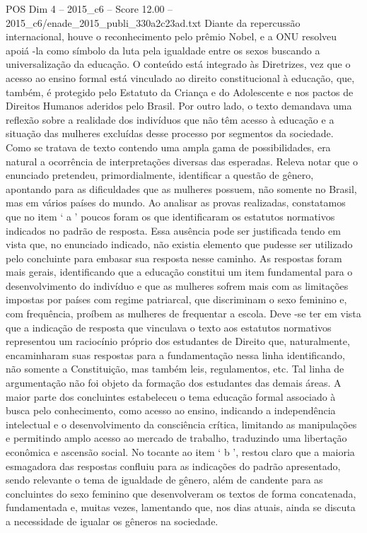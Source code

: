 \begin{textsample}{POS Dim 4 – 2015\_c6 – Score 12.00 – 2015\_c6/enade\_2015\_publi\_330a2c23ad.txt}
Diante da repercussão internacional, houve o reconhecimento pelo prêmio Nobel, e a ONU resolveu apoiá -la como símbolo da luta pela igualdade entre os sexos buscando a universalização da educação.
O conteúdo está integrado às Diretrizes, vez que o acesso ao ensino formal está vinculado ao direito constitucional à educação, que, também, é protegido pelo Estatuto da Criança e do Adolescente e nos pactos de Direitos Humanos aderidos pelo Brasil.
Por outro lado, o texto demandava uma reflexão sobre a realidade dos indivíduos que não têm acesso à educação e a situação das mulheres excluídas desse processo por segmentos da sociedade.
Como se tratava de texto contendo uma ampla gama de possibilidades, era natural a ocorrência de interpretações diversas das esperadas.
Releva notar que o enunciado pretendeu, primordialmente, identificar a questão de gênero, apontando para as dificuldades que as mulheres possuem, não somente no Brasil, mas em vários países do mundo.
Ao analisar as provas realizadas, constatamos que no item ‘ a ’ poucos foram os que identificaram os estatutos normativos indicados no padrão de resposta.
Essa ausência pode ser justificada tendo em vista que, no enunciado indicado, não existia elemento que pudesse ser utilizado pelo concluinte para embasar sua resposta nesse caminho.
As respostas foram mais gerais, identificando que a educação constitui um item fundamental para o desenvolvimento do indivíduo e que as mulheres sofrem mais com as limitações impostas por países com regime patriarcal, que discriminam o sexo feminino e, com frequência, proíbem as mulheres de frequentar a escola.
Deve -se ter em vista que a indicação de resposta que vinculava o texto aos estatutos normativos representou um raciocínio próprio dos estudantes de Direito que, naturalmente, encaminharam suas respostas para a fundamentação nessa linha identificando, não somente a Constituição, mas também leis, regulamentos, etc.
Tal linha de argumentação não foi objeto da formação dos estudantes das demais áreas.
A maior parte dos concluintes estabeleceu o tema educação formal associado à busca pelo conhecimento, como acesso ao ensino, indicando a independência intelectual e o desenvolvimento da consciência crítica, limitando as manipulações e permitindo amplo acesso ao mercado de trabalho, traduzindo uma libertação econômica e ascensão social.
No tocante ao item ‘ b ’, restou claro que a maioria esmagadora das respostas confluiu para as indicações do padrão apresentado, sendo relevante o tema de igualdade de gênero, além de candente para as concluintes do sexo feminino que desenvolveram os textos de forma concatenada, fundamentada e, muitas vezes, lamentando que, nos dias atuais, ainda se discuta a necessidade de igualar os gêneros na sociedade.

\end{textsample}
